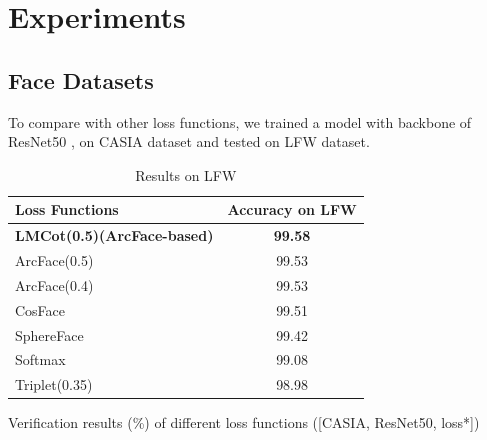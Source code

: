 \section{Experiments}
\subsection{Face Datasets} \label{s51}

To compare with other loss functions, we trained a model with backbone of ResNet50 \cite{He2016DeepRL}, \cite{Han2017DeepPR} on CASIA \cite{Yi2014LearningFR} dataset and tested on LFW \cite{LFWTech, LFWTechUpdate} dataset.
\begin{table}[htbp]
\caption{Results on LFW}
\label{table01}
\begin{center}
\begin{threeparttable}
    \begin{tabular}{|l|c|}
    \hline
    Loss Functions                     & Accuracy on LFW \\ \hline
    \textbf{LMCot(0.5)(ArcFace-based)} & \textbf{99.58}  \\ \hline
    ArcFace(0.5)                       & 99.53           \\ \hline
    ArcFace(0.4)                       & 99.53           \\ \hline
    CosFace                            & 99.51           \\ \hline
    SphereFace                         & 99.42           \\ \hline
    Softmax                            & 99.08           \\ \hline
    Triplet(0.35)                      & 98.98           \\ \hline
    \end{tabular}
    
    \begin{tablenotes}
      \small
      \item Verification results (\%) of different loss functions ([CASIA, ResNet50, loss*])
    \end{tablenotes}
\end{threeparttable}
\end{center}
\end{table}

